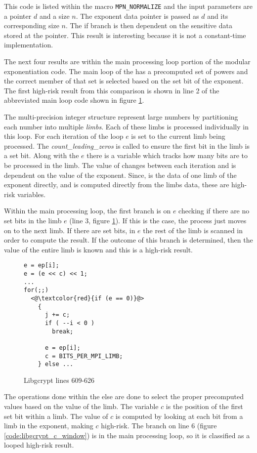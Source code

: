 This code is listed within the macro \texttt{MPN\_NORMALIZE} and the input
parameters are a pointer $d$ and a size $n$. The exponent data pointer is passed
as $d$ and its corresponding size $n$. The if branch is then dependent on the
sensitive data stored at the pointer. This result is interesting because it is
not a constant-time implementation.

The next four results are within the main processing loop portion of the modular
exponentiation code. The main loop of the has a precomputed set of powers and
the correct member of that set is selected based on the set bit of the exponent.
The first high-risk result from this comparison is shown in line 2 of the
abbreviated main loop code shown in figure \ref{code:libgcrypt_mainloop}.

The multi-precision integer structure represent large numbers by partitioning
each number into multiple \textit{limbs}. Each of these limbs is
processed individually in this loop. For each iteration of the loop $e$ is set
to the current limb being processed. The \textit{count\_leading\_zeros}
is called to ensure the first bit in the limb is a set bit. Along with the $e$
there is a variable  which tracks how many bits are to be processed in the
limb. The value of  changes between each iteration and is dependent on the
value of the exponent. Since,  is the data of one limb of the exponent
directly, and  is computed directly from the limbs data, these are high-risk
variables.

Within the main processing loop, the first branch is on $e$ checking if there
are no set bits in the limb $e$ (line 3, figure \ref{code:libgcrypt_mainloop}).
If this is the case, the process just moves on to the next limb. If there are
set bits, in $e$ the rest of the limb is scanned in order to compute the result.
If the outcome of this branch is determined, then the value of the entire limb
is known and this is a high-risk result.
\begin{figure}[h!]
\begin{lstlisting}
e = ep[i];
e = (e << c) << 1;
...
for(;;)
  <@\textcolor{red}{if (e == 0)}@>
    {
      j += c;
      if ( --i < 0 )
        break;

      e = ep[i];
      c = BITS_PER_MPI_LIMB;
    } else ...
\end{lstlisting}
\caption{Libgcrypt lines 609-626}
\label{code:libgcrypt_mainloop}
\end{figure}


The operations done within the else are done to select the proper precomputed
values based on the value of the limb. The variable $c$ is the position of the
first set bit within a limb.  The value of $c$ is computed by looking
at each bit from a limb in the exponent, making $c$ high-risk. The branch on
line 6 (figure \ref{code:libgcrypt_c_window}) is in the main processing loop, so it is classified as a looped high-risk result.


